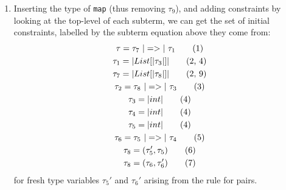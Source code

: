 \begin{exercise}{}
\begin{solution}
\begin{enumerate}
      \item
      Inserting the type of \lstinline|map| (thus removing \(\tau_9\)), and
      adding constraints by looking at the top-level of each subterm, we can get
      the set of initial constraints, labelled by the subterm equation above
      they come from:
      \begin{gather*}
        \tau = \tau_7 ~\ato~ \tau_1 \tag{1} \\
        \tau_1 = \alist{\tau_3} \tag{2, 4} \\
        \tau_7 = \alist{\tau_8} \tag{2, 9} \\
        \tau_2 = \tau_8 ~\ato~ \tau_3 \tag{3} \\
        \tau_3 = \aint \tag{4} \\
        \tau_4 = \aint \tag{4} \\
        \tau_5 = \aint \tag{4} \\
        \tau_6 = \tau_5 ~\ato~ \tau_4 \tag{5} \\
        \tau_8 = (\tau_5', \tau_5) \tag{6} \\
        \tau_8 = (\tau_6, \tau_6') \tag{7}
      \end{gather*}
      for fresh type variables \(\tau_5'\) and \(\tau_6'\) arising from the rule
      for pairs.


\end{enumerate}
\end{solution}
\end{exercise}
